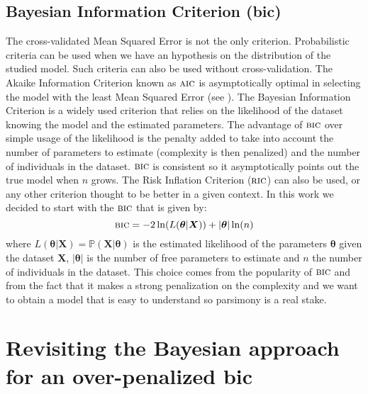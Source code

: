 \documentclass[12pt,a4paper]{report}
\begin{document}
			\subsection{Bayesian Information Criterion ({\sc bic})}
			 The cross-validated Mean Squared Error is not the only criterion. Probabilistic criteria can be used when we have an hypothesis on the distribution of the studied model. Such criteria can also be used without cross-validation. The Akaike Information Criterion \cite{akaike1974new} known as $\mbox{{\sc aic}}$ is asymptotically optimal in selecting the model with the least Mean Squared Error (see \cite{stone1977asymptotic}).
			The Bayesian Information Criterion \cite{BIChuard,schwarz1978estimating,yang2005can} is a widely used criterion that relies on the likelihood of the dataset knowing the model and the estimated parameters. The advantage of $\mbox{{\sc bic}}$ over simple usage of the likelihood is the penalty added to take into account the number of parameters to estimate (complexity is then penalized) and the number of individuals in the dataset. $\mbox{{\sc bic}}$ is consistent so it asymptotically points out the true model when $n$ grows. The Risk Inflation Criterion \cite{foster1994risk} ($\mbox{{\sc ric}}$) can also be used, or any other criterion \cite{george1993variable} thought to be better in a given context.
			In this work we decided to start with the $\mbox{{\sc bic}}$ that is given by:
			\begin{equation}
				\mbox{{\sc bic}}=-2\ln(L(\boldsymbol{\theta}|\boldsymbol{X}))+|\boldsymbol{\theta}|\ln(n)
			\end{equation}
			where $L(\boldsymbol{\theta}|\boldsymbol{X})=\mathbb{P}(\boldsymbol{X}|\boldsymbol{\theta})$ is the estimated likelihood of the parameters $\boldsymbol{\theta}$ given the dataset $\boldsymbol{X}$, $|\boldsymbol{\theta}|$ is the number of free parameters to estimate and $n$ the number of individuals in the dataset. This choice comes from the popularity of $\mbox{{\sc bic}}$ and from the fact that it makes a strong penalization on the complexity and we want to obtain a model that is easy to understand so parsimony is a real stake.
			


\section{Revisiting the Bayesian approach for an over-penalized {\sc bic}} 
\end{document}
